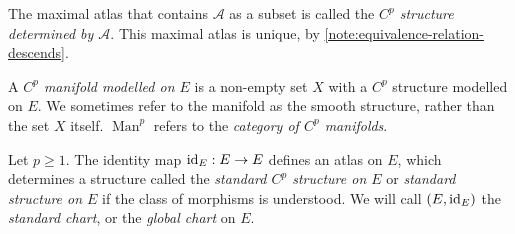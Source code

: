 \documentclass[../main-manifolds.tex]{subfiles}
\begin{document}
\begin{definition}\label{def:structure-of-manifold}
    The maximal atlas that contains $\mathcal{A}$ as a subset is called the \emph{$C^p$ structure determined by $\mathcal{A}$}. This maximal atlas is unique, by \cref{note:equivalence-relation-descends}.
\end{definition}
\begin{definition}[Manifold]\label{def:manifold}
    A \emph{$C^p$ manifold modelled on $E$} is a non-empty set $X$ with a $C^p$ structure modelled on $E$. We sometimes refer to the manifold as the smooth structure, rather than the set $X$ itself. $\operatorname{Man}^p$ refers to the \emph{category of $C^p$ manifolds}.
\end{definition}
\begin{wts}[$E$ is a manifold]\label{prop:banach-space-is-manifold}
    Let $p\geq 1$. The identity map $\operatorname{id}_{E}: E\to E$ defines an atlas on $E$, which determines a structure called the \emph{standard $C^p$ structure on $E$} or \emph{standard structure on $E$} if the class of morphisms is understood. We will call $(E,\operatorname{id}_{E})$ the \emph{standard chart}, or the \emph{global chart} on $E$.
\end{wts}
\end{document}

